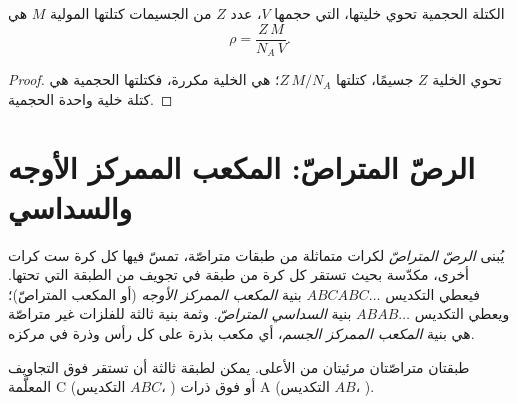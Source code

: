 \begin{proposition}\label{prop:b1:crystals-metals:density}
الكتلة الحجمية  تحوي خليتها، التي حجمها $V$، عدد $Z$ من
الجسيمات كتلتها المولية $M$ هي
\[
  \rho = \frac{Z\,M}{N_A\,V} .
\]
\end{proposition}

\begin{proof}
تحوي الخلية $Z$ جسيمًا، كتلتها $Z\,M/N_A$؛  هي
الخلية مكررة، فكتلتها الحجمية هي كتلة خلية واحدة الحجمية.
\end{proof}

\section{الرصّ المتراصّ: المكعب الممركز الأوجه والسداسي}

\begin{definition}\label{def:b1:crystals-metals:packings}
يُبنى \emph{الرصّ المتراصّ} لكرات متماثلة
من طبقات متراصّة، تمسّ فيها كل كرة ست كرات أخرى، مكدّسة
بحيث تستقر كل كرة من طبقة في تجويف من الطبقة التي تحتها. فيعطي
التكديس $ABCABC\dots$ بنية \emph{المكعب الممركز الأوجه}
(أو المكعب المتراصّ)؛ ويعطي التكديس $ABAB\dots$
بنية \emph{السداسي المتراصّ}.
وثمة بنية ثالثة للفلزات غير متراصّة هي بنية
\emph{المكعب الممركز الجسم}، أي
مكعب بذرة على كل رأس وذرة في مركزه.
\end{definition}

\begin{omfigure}

{\small طبقتان متراصّتان مرئيتان من الأعلى. يمكن لطبقة ثالثة أن تستقر
فوق التجاويف المعلَّمة C (التكديس $ABC$، ) أو فوق
ذرات A (التكديس $AB$، ).}
\end{omfigure}


